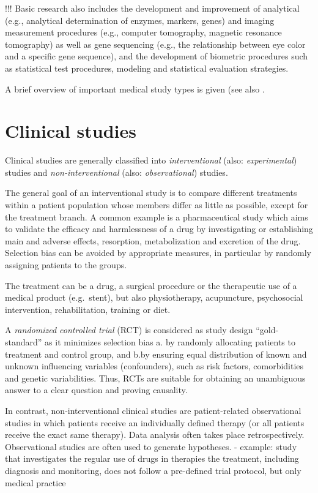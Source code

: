 \documentclass[
  oneside]{book}
\begin{document}
!!! Basic research also includes the development and improvement of analytical (e.g., analytical determination of enzymes, markers, genes) and imaging measurement procedures (e.g., computer tomography, magnetic resonance tomography) as well as gene sequencing (e.g., the relationship between eye color and a specific gene sequence), and the development of biometric procedures such as statistical test procedures, modeling and statistical evaluation strategies.

A brief overview of important medical study types is given (see also \autocite{thiese2014observational,Roehrig:Arztebl2009}.

\hypertarget{clinical-studies}{%
\section{Clinical studies}\label{clinical-studies}}

Clinical studies are generally classified into \emph{interventional} (also: \emph{experimental}) studies and \emph{non-interventional} (also: \emph{observational}) studies.

The general goal of an interventional study is to compare different treatments within a patient population whose members differ as little as possible, except for the treatment branch.
A common example is a pharmaceutical study which aims to validate the efficacy and harmlessness of a drug by investigating or establishing main and adverse effects, resorption, metabolization and excretion of the drug.
Selection bias can be avoided by appropriate measures, in particular by randomly assigning patients to the groups.

The treatment can be a drug, a surgical procedure or the therapeutic use of a medical product (e.g.~stent), but also physiotherapy, acupuncture, psychosocial intervention, rehabilitation, training or diet.

A \emph{randomized controlled trial} (RCT) is considered as study design ``gold-standard'' as it minimizes selection bias a. by randomly allocating patients to treatment and control group, and b.by ensuring equal distribution of known and unknown influencing variables (confounders), such as risk factors, comorbidities and genetic variabilities.
Thus, RCTs are suitable for obtaining an unambiguous answer to a clear question and proving causality.

In contrast, non-interventional clinical studies are patient-related observational studies in which patients receive an individually defined therapy (or all patients receive the exact same therapy).
Data analysis often takes place retrospectively.
Observational studies are often used to generate hypotheses.
- example: study that investigates the regular use of drugs in therapies
the treatment, including diagnosis and monitoring, does not follow a pre-defined trial protocol, but only medical practice
\end{document}

